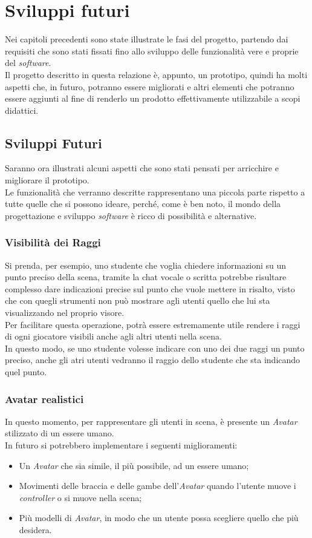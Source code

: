 \chapter{Sviluppi futuri}
Nei capitoli precedenti sono state illustrate le fasi del progetto, partendo dai requisiti che sono stati fissati fino allo sviluppo delle funzionalità vere e proprie del \textit{software}.
\\Il progetto descritto in questa relazione è, appunto, un prototipo, quindi ha molti aspetti che, in futuro, potranno essere migliorati e altri elementi che potranno essere aggiunti al fine di renderlo un prodotto effettivamente utilizzabile a scopi didattici.
\section{Sviluppi Futuri}
Saranno ora illustrati alcuni aspetti che sono stati pensati per arricchire e migliorare il prototipo.
\\Le funzionalità che verranno descritte rappresentano una piccola parte rispetto a tutte quelle che si possono ideare, perché, come è ben noto, il mondo della progettazione e sviluppo \textit{software} è ricco di possibilità e alternative.
\subsection{Visibilità dei Raggi}
Si prenda, per esempio, uno studente che voglia chiedere informazioni su un punto preciso della scena, tramite la chat vocale o scritta potrebbe risultare complesso dare indicazioni precise sul punto che vuole mettere in risalto, visto che con quegli strumenti non può mostrare agli utenti quello che lui sta visualizzando nel proprio visore. 
\\Per facilitare questa operazione, potrà essere estremamente utile rendere i raggi di ogni giocatore visibili anche agli altri utenti nella scena. 
\\In questo modo, se uno studente volesse indicare con uno dei due raggi un punto preciso, anche gli atri utenti vedranno il raggio dello studente che sta indicando quel punto.
\subsection{Avatar realistici}
In questo momento, per rappresentare gli utenti in scena, è presente un \textit{\gls{Avatar}} stilizzato di un essere umano.
\\In futuro si potrebbero implementare i seguenti miglioramenti:
\begin{itemize}
    \item Un \textit{Avatar} che sia simile, il più possibile, ad un essere umano;
    \item Movimenti delle braccia e delle gambe dell'\textit{Avatar} quando l'utente muove i \textit{controller} o si muove nella scena;
    \item Più modelli di \textit{Avatar}, in modo che un utente possa scegliere quello che più desidera.
\end{itemize}
